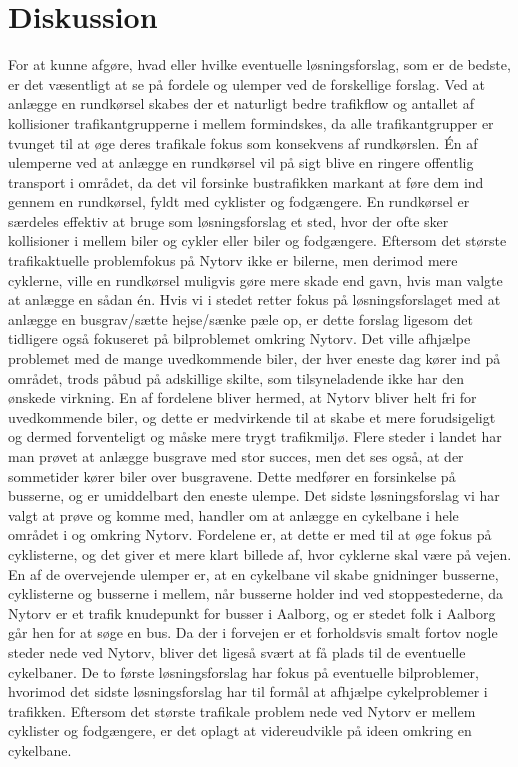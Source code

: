 \chapter{Diskussion}
\label{chap:diskussion}
For at kunne afgøre, hvad eller hvilke eventuelle løsningsforslag, som er de bedste, er det væsentligt at se på fordele og ulemper ved de forskellige forslag. Ved at anlægge en rundkørsel skabes der et naturligt bedre trafikflow og antallet af kollisioner trafikantgrupperne i mellem formindskes, da alle trafikantgrupper er tvunget til at øge deres trafikale fokus som konsekvens af rundkørslen. Én af ulemperne ved at anlægge en rundkørsel vil på sigt blive en ringere offentlig transport i området, da det vil forsinke bustrafikken markant at føre dem ind gennem en rundkørsel, fyldt med cyklister og fodgængere. En rundkørsel er særdeles effektiv at bruge som løsningsforslag et sted, hvor der ofte sker kollisioner i mellem biler og cykler eller biler og fodgængere. Eftersom det største trafikaktuelle problemfokus på Nytorv ikke er bilerne, men derimod mere cyklerne, ville en rundkørsel muligvis gøre mere skade end gavn, hvis man valgte at anlægge en sådan én.
Hvis vi i stedet retter fokus på løsningsforslaget med at anlægge en busgrav/sætte hejse/sænke pæle op, er dette forslag ligesom det tidligere også fokuseret på bilproblemet omkring Nytorv. Det ville afhjælpe problemet med de mange uvedkommende biler, der hver eneste dag kører ind på området, trods påbud på adskillige skilte, som tilsyneladende ikke har den ønskede virkning. En af fordelene bliver hermed, at Nytorv bliver helt fri for uvedkommende biler, og dette er medvirkende til at skabe et mere forudsigeligt og dermed forventeligt og måske mere trygt trafikmiljø. Flere steder i landet har man prøvet at anlægge busgrave med stor succes, men det ses også, at der sommetider kører biler over busgravene. Dette medfører en forsinkelse på busserne, og er umiddelbart den eneste ulempe.
Det sidste løsningsforslag vi har valgt at prøve og komme med, handler om at anlægge en cykelbane i hele området i og omkring Nytorv. Fordelene er, at dette er med til at øge fokus på cyklisterne, og det giver et mere klart billede af, hvor cyklerne skal være på vejen. En af de overvejende ulemper er, at en cykelbane vil skabe gnidninger busserne, cyklisterne og busserne i mellem, når busserne holder ind ved stoppestederne, da Nytorv er et trafik knudepunkt for busser i Aalborg, og er stedet folk i Aalborg går hen for at søge en bus. Da der i forvejen er et forholdsvis smalt fortov nogle steder nede ved Nytorv, bliver det ligeså svært at få plads til de eventuelle cykelbaner. De to første løsningsforslag har fokus på eventuelle bilproblemer, hvorimod det sidste løsningsforslag har til formål at afhjælpe cykelproblemer i trafikken. Eftersom det største trafikale problem nede ved Nytorv er mellem cyklister og fodgængere, er det oplagt at videreudvikle på ideen omkring en cykelbane.
